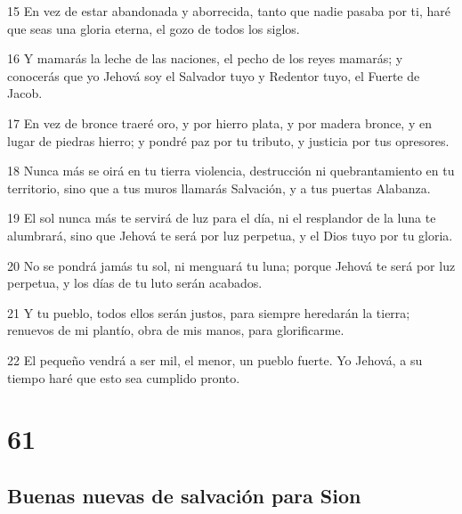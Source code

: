 \par 15 En vez de estar abandonada y aborrecida, tanto que nadie pasaba por ti, haré que seas una gloria eterna, el gozo de todos los siglos.
\par 16 Y mamarás la leche de las naciones, el pecho de los reyes mamarás; y conocerás que yo Jehová soy el Salvador tuyo y Redentor tuyo, el Fuerte de Jacob.
\par 17 En vez de bronce traeré oro, y por hierro plata, y por madera bronce, y en lugar de piedras hierro; y pondré paz por tu tributo, y justicia por tus opresores.
\par 18 Nunca más se oirá en tu tierra violencia, destrucción ni quebrantamiento en tu territorio, sino que a tus muros llamarás Salvación, y a tus puertas Alabanza.
\par 19 El sol nunca más te servirá de luz para el día, ni el resplandor de la luna te alumbrará, sino que Jehová te será por luz perpetua, y el Dios tuyo por tu gloria. 
\par 20 No se pondrá jamás tu sol, ni menguará tu luna; porque Jehová te será por luz perpetua, y los días de tu luto serán acabados.
\par 21 Y tu pueblo, todos ellos serán justos, para siempre heredarán la tierra; renuevos de mi plantío, obra de mis manos, para glorificarme.
\par 22 El pequeño vendrá a ser mil, el menor, un pueblo fuerte. Yo Jehová, a su tiempo haré que esto sea cumplido pronto.

\chapter{61}

\section*{Buenas nuevas de salvación para Sion}


